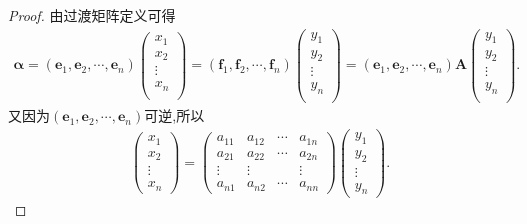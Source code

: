 \documentclass[../../main.tex]{subfiles}%
\begin{document}
\begin{proof}

由过渡矩阵定义可得
\begin{align*}
\boldsymbol{\alpha }=\left( \boldsymbol{e}_1,\boldsymbol{e}_2,\cdots ,\boldsymbol{e}_n \right) \left( \begin{array}{c}
x_1\\
x_2\\
\vdots\\
x_n\\
\end{array} \right) =\left( \boldsymbol{f}_1,\boldsymbol{f}_2,\cdots ,\boldsymbol{f}_n \right) \left( \begin{array}{c}
y_1\\
y_2\\
\vdots\\
y_n\\
\end{array} \right) =\left( \boldsymbol{e}_1,\boldsymbol{e}_2,\cdots ,\boldsymbol{e}_n \right) \boldsymbol{A}\left( \begin{array}{c}
y_1\\
y_2\\
\vdots\\
y_n\\
\end{array} \right) .
\end{align*}
又因为$\left( \boldsymbol{e}_1,\boldsymbol{e}_2,\cdots ,\boldsymbol{e}_n \right) $可逆,所以
\begin{gather*}
\begin{pmatrix}
x_1\\
x_2\\
\vdots\\
x_n
\end{pmatrix}=\begin{pmatrix}
a_{11}&a_{12}&\cdots&a_{1n}\\
a_{21}&a_{22}&\cdots&a_{2n}\\
\vdots&\vdots&&\vdots\\
a_{n1}&a_{n2}&\cdots&a_{nn}
\end{pmatrix}\begin{pmatrix}
y_1\\
y_2\\
\vdots\\
y_n
\end{pmatrix}.
\end{gather*}

\end{proof}
\end{document}

